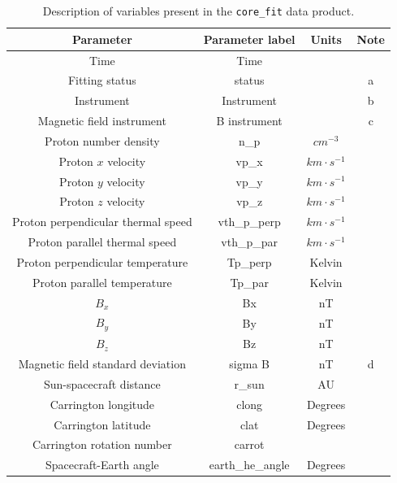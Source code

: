 \documentclass[11pt,a4paper]{article}
\begin{document}
\begin{table}
	\centering
	\begin{tabular}{| c | c | c | c |}
		\hline
		Parameter 					& Parameter label	& Units			& Note 				\\ \hline \hline \hline
		Time						 	& Time			& 				& 			\\ \hline
		Fitting status					& status			& 				& a	\\ \hline
		Instrument		 			& Instrument		& 				& b	\\ \hline
		Magnetic field instrument			& B instrument		&				& c	\\ \hline \hline
		Proton number density 			& n\_p			& $cm^{-3}$		&	\\ \hline
		Proton $x$ velocity		 		& vp\_x			& $km\cdot s^{-1}$	& \\ \hline
		Proton $y$ velocity		 		& vp\_y			& $km\cdot s^{-1}$	& \\ \hline
		Proton $z$ velocity		 		& vp\_z			& $km\cdot s^{-1}$	&\\ \hline
		Proton perpendicular thermal speed 	& vth\_p\_perp		& $km\cdot s^{-1}$	&\\ \hline
		Proton parallel thermal speed 		& vth\_p\_par		& $km\cdot s^{-1}$	&\\ \hline
		Proton perpendicular temperature	& Tp\_perp		& Kelvin			&	\\ \hline
		Proton parallel temperature	 	& Tp\_par			& Kelvin			&	\\ \hline \hline
		$B_{x}$						& Bx				& nT				& 	\\ \hline
		$B_{y}$						& By				& nT				& 	\\ \hline
		$B_{z}$						& Bz				& nT				& 	\\ \hline
		Magnetic field standard deviation	& sigma B			& nT				& d	\\ \hline \hline
		Sun-spacecraft distance			& r\_sun			& AU				&\\ \hline
		Carrington longitude				& clong			& Degrees		&	\\ \hline
		Carrington latitude				& clat			& Degrees		&	\\ \hline
		Carrington rotation number		& carrot			&				&	\\ \hline
		Spacecraft-Earth angle			& earth\_he\_angle	& Degrees		&	\\ \hline
	\end{tabular}
	\caption{Description of variables present in the \texttt{core\_fit} data product.}	
	\label{tab:variables}
	\small
	\begin{enumerate}[label=\alph*.]

\end{enumerate}
\end{table}
\end{document}
